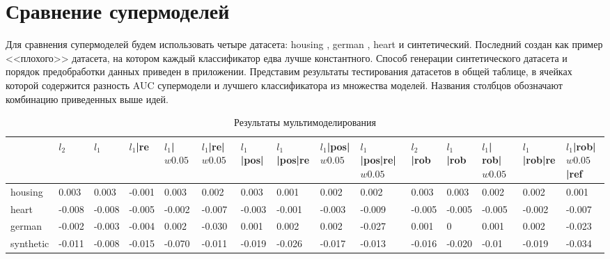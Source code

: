 \documentclass[12pt,twoside]{article}
\theoremstyle{plain}
\theoremstyle{remark}
\theoremstyle{definition}
\begin{document}
\section{Сравнение супермоделей}

Для сравнения супермоделей будем использовать четыре датасета: housing \cite{UCI:Housing}, german \cite{UCI:German}, heart \cite{UCI:Heart} и синтетический.  Последний создан как пример <<плохого>> датасета, на котором каждый классификатор едва лучше константного. Способ генерации синтетического датасета и порядок предобработки данных приведен в приложении. Представим результаты тестирования датасетов в общей таблице, в ячейках которой содержится разность AUC супермодели и лучшего классификатора из множества моделей. Названия столбцов обозначают комбинацию приведенных выше идей.

\newpage

\begin{table}
\centering
\caption{Результаты мультимоделирования}
\scriptsize
\begin{tabular}{|l|l|l|l|l|l|l|l|l|l|l|l|l|l|l|}
\hline
          & $l_2$  & $l_1$  & $l_1$|re & $l_1$| $w0.05$ & $l_1$|re|$w0.05$ & $l_1$|pos| & $l_1$|pos|re & $l_1$|pos|$w0.05$ & $l_1$|pos|re|$w0.05$ & $l_2$|rob & $l_1$|rob & $l_1$| rob|$w0.05$ & $l_1$|rob|re & $l_1$|rob|$w0.05$|ref \\ \hline
housing   & 0.003  & 0.003  & -0.001   & 0.003          & 0.002            & 0.003      & 0.001        & 0.002             & 0.002                & 0.003     & 0.003     & 0.002              & 0.002        & 0.001                 \\ \hline
heart     & -0.008 & -0.008 & -0.005   & -0.002         & -0.007           & -0.003     & -0.001       & -0.003            & -0.009               & -0.005    & -0.005    & -0.005             & -0.002       & -0.007                \\ \hline
german    & -0.002 & -0.003 & -0.004   & 0.002          & -0.030           & 0.001      & 0.002        & 0.002             & -0.027               & 0.001     & 0         & 0.001              & 0.002        & -0.023                \\ \hline
synthetic & -0.011 & -0.008 & -0.015   & -0.070         & -0.011           & -0.019     & -0.026       & -0.017            & -0.013               & -0.016    & -0.020    & -0.01              & -0.019       & -0.034                \\ \hline
\end{tabular}
\end{table}
\end{document}
